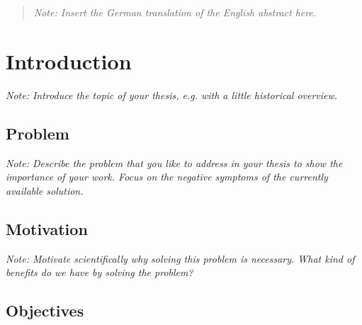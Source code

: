 \documentclass[a4paper,12pt,twoside]{report}
\begin{document}
\clearpage

\begin{abstract}

\textit{Note: Insert the German translation of the English abstract here.}

\end{abstract}

\clearpage



\tableofcontents
\clearpage

\clearpage

\begin{acronym}

\end{acronym}


\fancyhead{}
\pagestyle{fancy}
\fancyhead[LE]{\slshape \leftmark}
\fancyhead[RO]{\slshape \rightmark}
\headheight=15pt





\chapter{Introduction}

\textit{Note: Introduce the topic of your thesis, e.g. with a little historical overview.}

\section{Problem}

\textit{Note: Describe the problem that you like to address in your thesis to show the importance of your work. Focus on the negative symptoms of the currently available solution.}

\section{Motivation}

\textit{Note: Motivate scientifically why solving this problem is necessary. What kind of benefits do we have by solving the problem?}

\section{Objectives}
\end{document}
